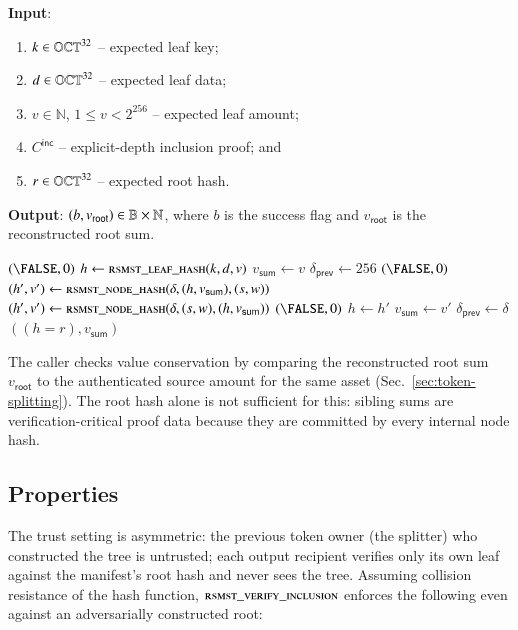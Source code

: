 \textbf{Input}:
\begin{enumerate}
	\item $k \in \mathbb{OCT}^{32}$ -- expected leaf key;
	\item $d \in \mathbb{OCT}^{32}$ -- expected leaf data;
	\item $v \in \mathbb{N}$, $1\leq v<2^{256}$ -- expected leaf amount;
	\item $C^\mathsf{inc}$ -- explicit-depth inclusion proof; and
	\item $r \in \mathbb{OCT}^{32}$ -- expected root hash.
\end{enumerate}

\textbf{Output}: $(b,v_\mathsf{root}) \in \mathbb{B}\times\mathbb{N}$, where $b$ is the success flag and $v_\mathsf{root}$ is the reconstructed root sum.

\begin{algorithmic}
		 \State \Return $(\FALSE,0)$ \EndIf
		\State $h \gets \Call{rsmst\_leaf\_hash}{k,d,v}$
		\State $v_\mathsf{sum} \gets v$
		\State $\delta_\mathsf{prev}\gets256$
				\State \Return $(\FALSE,0)$
			\EndIf
				\State $(h',v')\gets\Call{rsmst\_node\_hash}{\delta,(h,v_\mathsf{sum}),(s,w)}$
			\Else
				\State $(h',v')\gets\Call{rsmst\_node\_hash}{\delta,(s,w),(h,v_\mathsf{sum})}$
			\EndIf
			 \State \Return $(\FALSE,0)$ \EndIf
			\State $h\gets h'$
			\State $v_\mathsf{sum}\gets v'$
			\State $\delta_\mathsf{prev}\gets\delta$
		\EndFor
		\State \Return $((h=r),v_\mathsf{sum})$
	\EndFunction
\end{algorithmic}

The caller checks value conservation by comparing the reconstructed root sum $v_\mathsf{root}$ to the authenticated source amount for the same asset (Sec.~\ref{sec:token-splitting}). The root hash alone is not sufficient for this: sibling sums are verification-critical proof data because they are committed by every internal node hash.

\subsection{Properties}\label{sec:rsmst-properties}

The trust setting is asymmetric: the previous token owner (the splitter) who constructed the tree is untrusted; each output recipient verifies only its own leaf against the manifest's root hash and never sees the tree. Assuming collision resistance of the hash function, $\textsc{rsmst\_verify\_inclusion}$ enforces the following even against an adversarially constructed root:

